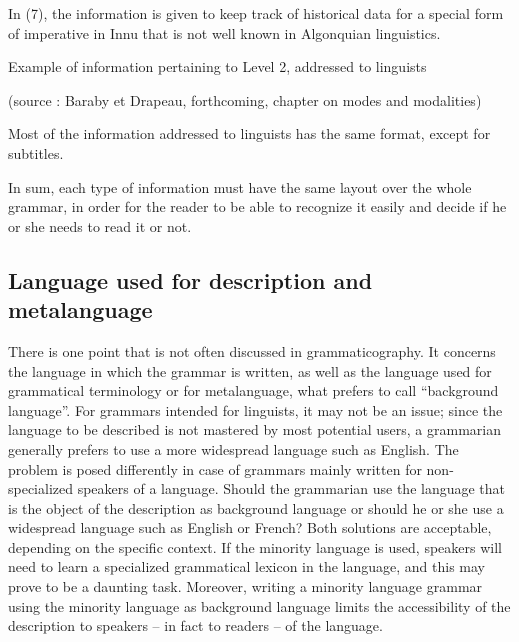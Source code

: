 \z


In (7), the information is given to keep track of historical data for a special form of imperative in Innu that is not well known in Algonquian linguistics.

\ea Example of information pertaining to Level 2, addressed to linguists


(source : Baraby et Drapeau, forthcoming, chapter on modes and modalities)

\z

Most of the information addressed to linguists has the same format, except for subtitles.

In sum, each type of information must have the same layout over the whole grammar, in order for the reader to be able to recognize it easily and decide if he or she needs to read it or not.

\subsection{Language used for description and metalanguage}\label{baraby:sec:4.3}
 There is one point that is not often discussed in grammaticography. It concerns the language in which the grammar is written, as well as the language used for grammatical terminology or for metalanguage, what  \citet[134]{Lehmann1989} prefers to call ``background language''. For grammars intended for linguists, it may not be an issue; since the language to be described is not mastered by most potential users, a grammarian generally prefers to use a more widespread language such as English. The problem is posed differently in case of grammars mainly written for non-specialized speakers of a language. Should the grammarian use the language that is the object of the description as background language or should he or she use a widespread language such as English or French? Both solutions are acceptable, depending on the specific context. If the minority language is used, speakers will need to learn a specialized grammatical lexicon in the language, and this may prove to be a daunting task. Moreover, writing a minority language grammar using the minority language as background language limits the accessibility of the description to speakers -- in fact to readers -- of the language.

